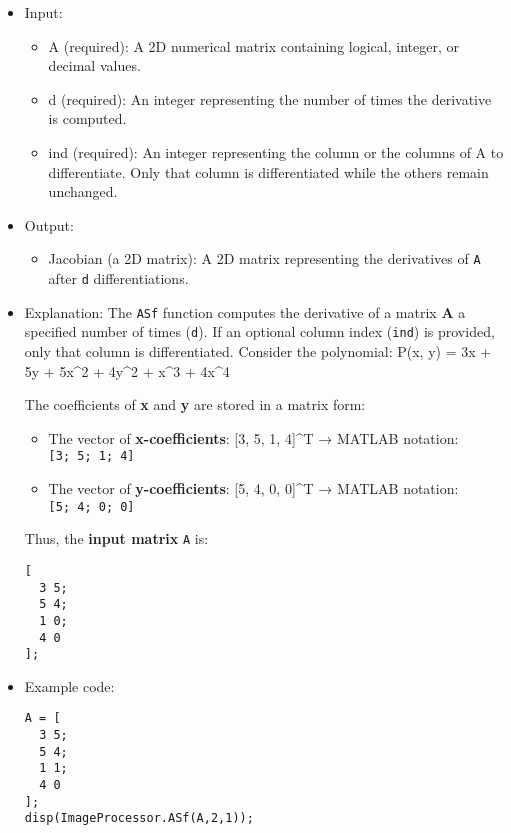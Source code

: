 \documentclass[11pt]{amsart}
\theoremstyle{remark}
\providecommand{\tightlist}{%
  \setlength{\itemsep}{0pt}\setlength{\parskip}{0pt}}
\theoremstyle{definition}
\theoremstyle{remark}
\numberwithin{equation}{section}
\begin{document}
\begin{itemize}
\item
  Input:

  \begin{itemize}
  \tightlist
  \item
    A (required): A 2D numerical matrix containing logical, integer, or
    decimal values.\\
  \item
    d (required): An integer representing the number of times the
    derivative is computed.\\
  \item
    ind (required): An integer representing the column or the columns of
    A to differentiate. Only that column is differentiated while the
    others remain unchanged.
  \end{itemize}
\item
  Output:

  \begin{itemize}
  \tightlist
  \item
    Jacobian (a 2D matrix): A 2D matrix representing the derivatives of
    \texttt{A} after \texttt{d} differentiations.
  \end{itemize}
\item
  Explanation: The \texttt{ASf} function computes the derivative of a
  matrix \textbf{A} a specified number of times (\texttt{d}). If an
  optional column index (\texttt{ind}) is provided, only that column is
  differentiated. Consider the polynomial: P(x, y) = 3x + 5y + 5x^2 + 4y^2
  + x^3 + 4x^4

  The coefficients of \textbf{x} and \textbf{y} are stored in a matrix
  form:

  \begin{itemize}
  \tightlist
  \item
    The vector of \textbf{x-coefficients}: {[}3, 5, 1, 4{]}^T → MATLAB
    notation: \texttt{{[}3;\ 5;\ 1;\ 4{]}}
  \item
    The vector of \textbf{y-coefficients}: {[}5, 4, 0, 0{]}^T → MATLAB
    notation: \texttt{{[}5;\ 4;\ 0;\ 0{]}}
  \end{itemize}

  Thus, the \textbf{input matrix} \texttt{A} is:

\begin{verbatim}
[
  3 5;
  5 4;
  1 0;
  4 0
];
\end{verbatim}
\item
  Example code:

\begin{verbatim}
A = [
  3 5;
  5 4;
  1 1;
  4 0
];
disp(ImageProcessor.ASf(A,2,1));
\end{verbatim}


\end{itemize}
\end{document}
